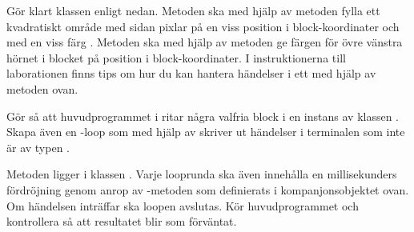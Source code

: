Gör klart klassen  enligt nedan. Metoden  ska med hjälp av metoden  fylla ett kvadratiskt område med sidan  pixlar på en viss position  i block-koordinater och med en viss färg . Metoden  ska med hjälp av metoden  ge färgen för övre vänstra hörnet i blocket på position  i block-koordinater.
%
%
%
%
%
%
%
I instruktionerna till laborationen \texttt{\LabWeekSIX} finns tips om hur du kan hantera händelser i ett  med hjälp av metoden  ovan.

\Subtask Gör så att huvudprogrammet i  ritar några valfria block i en instans av klassen . Skapa även en -loop som med hjälp av  skriver ut händelser i terminalen som inte är av typen . 

Metoden  ligger i klassen . Varje looprunda ska även innehålla en  millisekunders fördröjning genom anrop av -metoden som definierats i kompanjonsobjektet  ovan. Om händelsen  inträffar ska loopen avslutas. Kör huvudprogrammet och kontrollera så att resultatet blir som förväntat.

